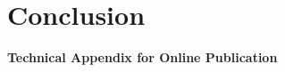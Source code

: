 \documentclass[11pt]{article}
\begin{document}
	\section{Conclusion}
	\label{S:Conclusion}
	
	
	
	\newpage
	
	
	
	
	\newpage
	\appendix
	\setcounter{equation}{0}
	\renewcommand{\theequation}{\thesection\arabic{equation}}
	\begin{center}
		\textbf{\LARGE{Technical Appendix for Online Publication}}
	\end{center}
	
\end{document}
